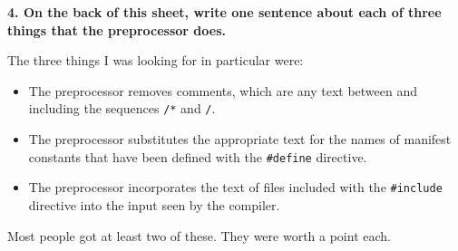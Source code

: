 {\bf 4.  On the back of this sheet, write one sentence about each of three
things that the preprocessor does.}

The three things I was looking for in particular were:  

\begin{itemize}
\item The preprocessor removes comments, which are any text between and
including the sequences {\tt /*} and {\tt */}.
\item The preprocessor substitutes the appropriate text for the names of
manifest constants that have been defined with the {\tt\#define}
directive.
\item The preprocessor incorporates  the text of files included with the
{\tt\#include} directive into the input seen by the compiler.
\end{itemize}

Most people got at least two of these.  They were worth a point each.



